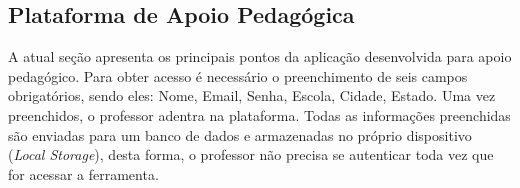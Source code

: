 \documentclass[alpha-refs,brazilian]{RBCA_v2.0}
\begin{document}
\subsection{Plataforma de Apoio Pedagógica}\label{subsecao:PlataformaApoio}

A atual seção apresenta os principais pontos da aplicação desenvolvida para apoio pedagógico. Para obter acesso é necessário o preenchimento de seis campos obrigatórios, sendo eles: Nome, Email, Senha, Escola, Cidade, Estado. Uma vez preenchidos, o professor adentra na plataforma. Todas as informações preenchidas são enviadas para um banco de dados e armazenadas no próprio dispositivo (\textit{Local Storage}), desta forma, o professor não precisa se autenticar toda vez que for acessar a ferramenta. 


 \begin{figure}[h]
  \centering
  \label{fig:PlataformaApoio1}

\end{figure}
\end{document}
